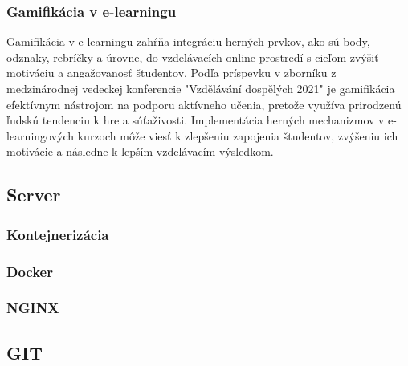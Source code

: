 \subsubsection{Gamifikácia v e-learningu}
Gamifikácia v e-learningu zahŕňa integráciu herných prvkov, ako sú body, odznaky, rebríčky a úrovne, do vzdelávacích online prostredí s cieľom zvýšiť motiváciu a angažovanosť študentov.
 Podľa príspevku v zborníku z medzinárodnej vedeckej konferencie "Vzdělávání dospělých 2021" \cite{gamifikacia} je gamifikácia efektívnym nástrojom na podporu aktívneho učenia, pretože využíva prirodzenú ľudskú tendenciu k hre a súťaživosti.
  Implementácia herných mechanizmov v e-learningových kurzoch môže viesť k zlepšeniu zapojenia študentov, zvýšeniu ich motivácie a následne k lepším vzdelávacím výsledkom.

\subsection{Server}
\subsubsection{Kontejnerizácia}
\subsubsection{Docker}
\subsubsection{NGINX}
\subsection{GIT}